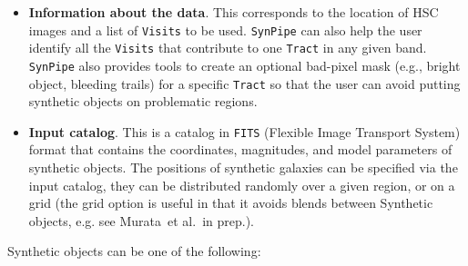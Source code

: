 \documentclass[useamsfonts]{pasj01}
\def\etal{{\ et al.~}}
\def\synpipe{\texttt{SynPipe}}
\def\tract{\texttt{Tract}}
\def\visits{\texttt{Visits}}
\begin{document}
    \begin{itemize}

        \item \textbf{Information about the data}. 
            This  corresponds to the location of HSC images and a list of \visits{} to 
            be used. 
            \synpipe{} can also help the user identify all the \visits{} that contribute 
            to one \tract{} in any given band.
            \synpipe{} also provides tools to create an optional bad-pixel mask
            (e.g., bright object, bleeding trails) for a specific \tract{} so that
            the user can avoid putting synthetic objects on problematic regions.

        \item \textbf{Input catalog}. 
            This is a catalog in \texttt{FITS} (Flexible Image Transport System)
            format that contains the coordinates, magnitudes, and model parameters of 
            synthetic objects.  
            The positions of synthetic galaxies can be specified via the input catalog, 
            they can be distributed randomly over a given region, or on a grid 
            (the grid option is useful in that it avoids blends between Synthetic 
            objects, e.g. see Murata\etal in prep.).  
            
    \end{itemize}

    
    \noindent Synthetic objects can be one of the following:
\end{document}
